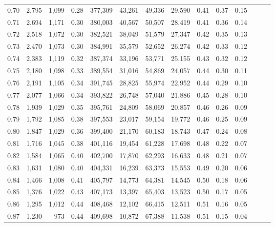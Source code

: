 \begin{tabular}{rrrrrrrrrrrrrr}
0.70 &   2,795 &  1,099 &  0.28 &  377,309 &   43,261 &  49,336 &  29,590 &  0.41 &  0.37 &      0.15 \\
0.71 &   2,694 &  1,171 &  0.30 &  380,003 &   40,567 &  50,507 &  28,419 &  0.41 &  0.36 &      0.14 \\
0.72 &   2,518 &  1,072 &  0.30 &  382,521 &   38,049 &  51,579 &  27,347 &  0.42 &  0.35 &      0.13 \\
0.73 &   2,470 &  1,073 &  0.30 &  384,991 &   35,579 &  52,652 &  26,274 &  0.42 &  0.33 &      0.12 \\
0.74 &   2,383 &  1,119 &  0.32 &  387,374 &   33,196 &  53,771 &  25,155 &  0.43 &  0.32 &      0.12 \\
0.75 &   2,180 &  1,098 &  0.33 &  389,554 &   31,016 &  54,869 &  24,057 &  0.44 &  0.30 &      0.11 \\
0.76 &   2,191 &  1,105 &  0.34 &  391,745 &   28,825 &  55,974 &  22,952 &  0.44 &  0.29 &      0.10 \\
0.77 &   2,077 &  1,066 &  0.34 &  393,822 &   26,748 &  57,040 &  21,886 &  0.45 &  0.28 &      0.10 \\
0.78 &   1,939 &  1,029 &  0.35 &  395,761 &   24,809 &  58,069 &  20,857 &  0.46 &  0.26 &      0.09 \\
0.79 &   1,792 &  1,085 &  0.38 &  397,553 &   23,017 &  59,154 &  19,772 &  0.46 &  0.25 &      0.09 \\
0.80 &   1,847 &  1,029 &  0.36 &  399,400 &   21,170 &  60,183 &  18,743 &  0.47 &  0.24 &      0.08 \\
0.81 &   1,716 &  1,045 &  0.38 &  401,116 &   19,454 &  61,228 &  17,698 &  0.48 &  0.22 &      0.07 \\
0.82 &   1,584 &  1,065 &  0.40 &  402,700 &   17,870 &  62,293 &  16,633 &  0.48 &  0.21 &      0.07 \\
0.83 &   1,631 &  1,080 &  0.40 &  404,331 &   16,239 &  63,373 &  15,553 &  0.49 &  0.20 &      0.06 \\
0.84 &   1,466 &  1,008 &  0.41 &  405,797 &   14,773 &  64,381 &  14,545 &  0.50 &  0.18 &      0.06 \\
0.85 &   1,376 &  1,022 &  0.43 &  407,173 &   13,397 &  65,403 &  13,523 &  0.50 &  0.17 &      0.05 \\
0.86 &   1,295 &  1,012 &  0.44 &  408,468 &   12,102 &  66,415 &  12,511 &  0.51 &  0.16 &      0.05 \\
0.87 &   1,230 &    973 &  0.44 &  409,698 &   10,872 &  67,388 &  11,538 &  0.51 &  0.15 &      0.04 \\

\end{tabular}
